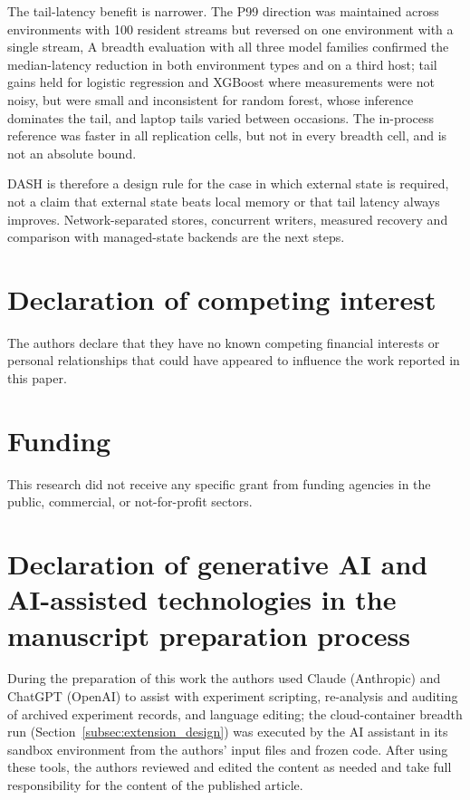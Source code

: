 \documentclass[a4paper,fleqn]{cas-dc}
\begin{document}
The tail-latency benefit is narrower. The P99 direction was maintained across environments with 100 resident streams but reversed on one environment with a single stream, A breadth evaluation with all three model families confirmed the median-latency reduction in both environment types and on a third host; tail gains held for logistic regression and XGBoost where measurements were not noisy, but were small and inconsistent for random forest, whose inference dominates the tail, and laptop tails varied between occasions. The in-process reference was faster in all replication cells, but not in every breadth cell, and is not an absolute bound.

DASH is therefore a design rule for the case in which external state is required, not a claim that external state beats local memory or that tail latency always improves. Network-separated stores, concurrent writers, measured recovery and comparison with managed-state backends are the next steps.

\printcredits

\section*{Declaration of competing interest}
The authors declare that they have no known competing financial interests or personal relationships that could have appeared to influence the work reported in this paper.

\section*{Funding}
This research did not receive any specific grant from funding agencies in the public, commercial, or not-for-profit sectors.

\section*{Declaration of generative AI and AI-assisted technologies in the manuscript preparation process}
During the preparation of this work the authors used Claude (Anthropic) and ChatGPT (OpenAI) to assist with experiment scripting, re-analysis and auditing of archived experiment records, and language editing; the cloud-container breadth run (Section~\ref{subsec:extension_design}) was executed by the AI assistant in its sandbox environment from the authors' input files and frozen code. After using these tools, the authors reviewed and edited the content as needed and take full responsibility for the content of the published article.
\end{document}
